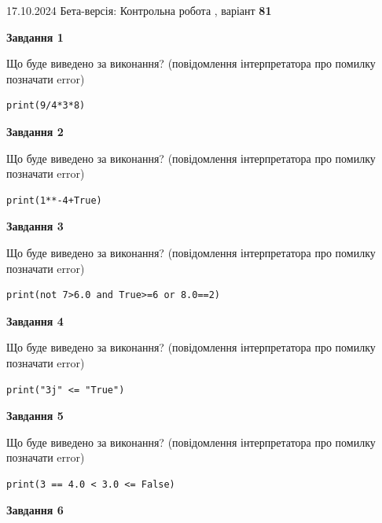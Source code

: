 \documentclass[12pt, ukrainian]{article}
\begin{document}
{\Large{17.10.2024 Бета-версія: Контрольна робота , варіант  \No \textbf { 81 }\par}}
{
\begin {large}
{\begin {center}\textbf{Завдання 1}\end {center}}

Що буде виведено за виконання? (повідомлення інтерпретатора про помилку позначати error)\par
\begin{verbatim}
print(9/4*3*8)
\end{verbatim}

{\begin {center}\textbf{Завдання 2}\end {center}}

Що буде виведено за виконання? (повідомлення інтерпретатора про помилку позначати error)\par
\begin{verbatim}
print(1**-4+True)
\end{verbatim}

{\begin {center}\textbf{Завдання 3}\end {center}}

Що буде виведено за виконання? (повідомлення інтерпретатора про помилку позначати error)\par
\begin{verbatim}
print(not 7>6.0 and True>=6 or 8.0==2)
\end{verbatim}

{\begin {center}\textbf{Завдання 4}\end {center}}

Що буде виведено за виконання? (повідомлення інтерпретатора про помилку позначати error)\par
\begin{verbatim}
print("3j" <= "True")
\end{verbatim}

{\begin {center}\textbf{Завдання 5}\end {center}}

Що буде виведено за виконання? (повідомлення інтерпретатора про помилку позначати error)\par
\begin{verbatim}
print(3 == 4.0 < 3.0 <= False)
\end{verbatim}

{\begin {center}\textbf{Завдання 6}\end {center}}


\end{large}}
\end{document}
